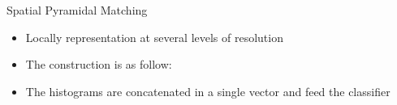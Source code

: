 \documentclass[usenames,dvipsnames]{beamer}
\begin{document}
\begin{frame}{Spatial Pyramidal Matching}
\begin{itemize}
\item<1-> Locally representation at several levels of resolution
\item<2-> The construction is as follow:
\item<6> The histograms are concatenated in a single vector and feed the classifier
\end{itemize}

\centering{}
\centering{}
\centering{}
\centering{}

\end{frame}
\end{document}
